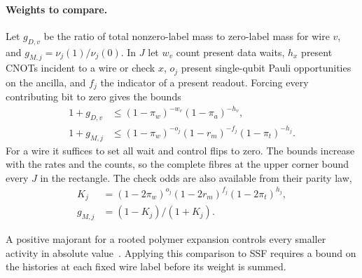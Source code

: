 \documentclass[10pt,twocolumn]{article}
\theoremstyle{definition}
\begin{document}
\paragraph{Weights to compare.}
Let $g_{D,v}$ be the ratio of total nonzero-label mass to zero-label
mass for wire $v$, and $g_{M,j}=\nu_j(1)/\nu_j(0)$. In $J$ let $w_v$
count present data waits, $h_x$ present CNOTs incident to a wire or
check $x$, $o_j$ present single-qubit Pauli opportunities on the ancilla,
and $f_j$ the indicator of a present readout. Forcing every contributing
bit to zero gives the bounds
\begin{equation}\label{eq:fibre-odds}
\begin{aligned}
 1+g_{D,v}&\le (1-\pi_w)^{-w_v}(1-\pi_a)^{-h_v},\\
 1+g_{M,j}&\le (1-\pi_w)^{-o_j}(1-r_m)^{-f_j}(1-\pi_t)^{-h_j}.
\end{aligned}
\end{equation}
For a wire it suffices to set all wait and control flips to zero.
The bounds increase with the rates and the counts, so the complete
fibres at the upper corner bound every $J$ in the rectangle.
The check odds are also available from their parity law,
\begin{equation}\label{eq:fibre-check-parity}
\begin{aligned}
 K_j&=(1-2\pi_w)^{o_j}(1-2r_m)^{f_j}(1-2\pi_t)^{h_j},\\
 g_{M,j}&=(1-K_j)/(1+K_j).
\end{aligned}
\end{equation}

A positive majorant for a rooted polymer expansion controls every
smaller activity in absolute value~\cite[Eq.~(2.7)]{FP07}. Applying
this comparison to SSF requires a bound on the histories at each
fixed wire label before its weight is summed.
\end{document}
